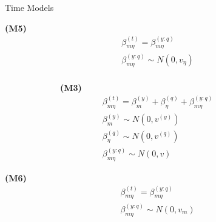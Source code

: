 \documentclass[ xcolor = pdftex, dvipsnames, table ]{beamer}
\begin{document}
\begin{frame}{Time Models}
\begin{minipage}{0.3\textwidth}
\begin{center}
\textbf{(M5)}
\begin{eqnarray*}
&\beta^{(t)}_{m\eta} = \beta^{(y:q)}_{m\eta}&\\
&\beta^{(y:q)}_{m\eta} \sim N(0, v_\eta)&\\
&~&
\end{eqnarray*}
\end{center}
\end{minipage}
\begin{minipage}{0.3\textwidth}
\begin{center}
~~~~~~~~~~~~~\textbf{(M3)}
\begin{eqnarray*}
&\beta^{(t)}_{m\eta} = \beta^{(y)}_{m} + \beta^{(q)}_{\eta} + \beta^{(y:q)}_{m\eta} & \\
&\beta^{(y)}_{m} \sim N(0, v^{(y)}) & \\
&\beta^{(q)}_{\eta} \sim N(0, v^{(q)}) & \\
&\beta^{(y:q)}_{m\eta} \sim N(0, v) &
\end{eqnarray*}
\end{center}

\begin{center}
\textbf{(M6)}
\begin{eqnarray*}
&\beta^{(t)}_{m\eta} = \beta^{(y:q)}_{m\eta}&\\
&\beta^{(y:q)}_{m\eta} \sim N(0, v_m)&\\
&&
\end{eqnarray*}
\end{center}
\end{minipage}
\end{frame}

%
%
\end{document}
